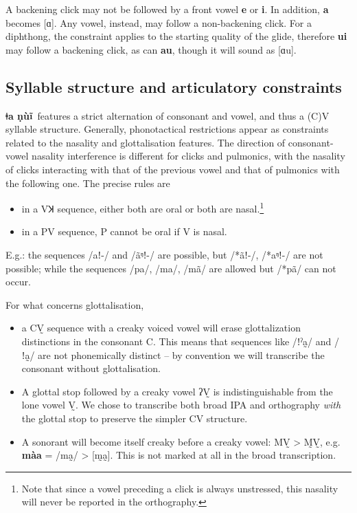 \documentclass[11pt]{book}
\newcommand{\qcn}[1]{\textbf{#1}}
\newcommand{\langname}{\qcn{ǂa ṇùĩ}~}
\begin{document}
A backening click may not be followed by a front vowel \qcn{e} or \qcn{i}. In addition, \qcn{a} becomes [ɑ]. Any vowel, instead, may follow a non-backening click. For a diphthong, the constraint applies to the starting quality of the glide, therefore \qcn{ui} may follow a backening click, as can \qcn{au}, though it will sound as [ɑu].

\subsection{Syllable structure and articulatory constraints}\label{sec:syllables}

\langname features a strict alternation of consonant and vowel, and thus a (C)V syllable structure. Generally, phonotactical restrictions appear as constraints related to the nasality and glottalisation features. The direction of consonant-vowel nasality interference is different for clicks and pulmonics, with the nasality of clicks interacting with that of the previous vowel and that of pulmonics with the following one. The precise rules are

\begin{itemize}
	\item in a VꞰ sequence, either both are oral or both are nasal.\footnote{Note that since a vowel preceding a click is always unstressed, this nasality will never be reported in the orthography.}
	\item in a PV sequence, P cannot be oral if V is nasal.
\end{itemize}

E.g.: the sequences /aǃ-/ and /ãᵑǃ-/ are possible, but /*ãǃ-/, /*aᵑǃ-/ are not possible; while the sequences /pa/, /ma/, /mã/ are allowed but /*pã/ can not occur.

For what concerns glottalisation, 

\begin{itemize}
\item a CV̰ sequence with a creaky voiced vowel will erase glottalization distinctions in the consonant C. This means that sequences like /ǃˀa̰/ and /ǃa̰/ are not phonemically distinct -- by convention we will transcribe the consonant without glottalisation. 
\item A glottal stop followed by a creaky vowel ʔV̰ is indistinguishable from the lone vowel V̰. We chose to transcribe both broad IPA and orthography \emph{with} the glottal stop to preserve the simpler CV structure.
\item A sonorant will become itself creaky before a creaky vowel: MV̰ > M̰V̰, e.g. \qcn{màa} = /ma̰/ > [m̰a̰]. This is not marked at all in the broad transcription.
\end{itemize}
\end{document}
